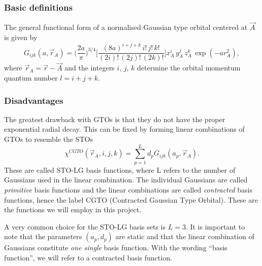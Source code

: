 \frame
{
  \frametitle{Basic definitions}
\begin{small}
{\scriptsize
The general functional form of a normalised Gaussian type orbital 
centered at $\vec A$ is given by
\begin{equation}
 G_{ijk}(a, \vec r_A) = \Big(\frac{2a}{\pi}\Big)^{3/4}\Big[\frac{(8a)^{i+j+k}\,i!\,j!\,k!}{(2i)!\,(2j)!\,(2k)!}\Big]x_A^i\,y_A^j\,z_A^k\,\exp(-a r_A^2),
\end{equation}
where $\vec r_A = \vec r - \vec A$ and the integers $i$, $j$, $k$ determine the orbital momentum quantum number $l=i+j+k$. 


}
\end{small}
}
\frame
{
  \frametitle{Disadvantages}
\begin{small}
{\scriptsize
The greatest drawback with GTOs is that they do not have the proper exponential radial decay. This can be fixed by forming linear combinations of GTOs
to resemble the STOs
\begin{equation}
 \chi^{CGTO}(\vec r_A,i,j,k) = \sum_{p=1}^L d_p G_{ijk}(a_p, \vec r_A).
\end{equation}
These are called STO-LG basis functions, where L refers to the number of Gaussians used in the linear combination.
The individual Gaussians are called \emph{primitive} basis functions and the linear combinations are called \emph{contracted} basis functions, hence the label
CGTO (Contracted Gaussian Type Orbital). These are the functions we will employ in this project.

A very common choice for the STO-LG basis sets is $L=3$. 
It is important to note that the parameters $(a_p,d_p)$ are static and that the linear combination of Gaussians constitute \emph{one single}
basis function. With the wording ``basis function'', we  will refer to a contracted basis function.
}
\end{small}
}
\frame
